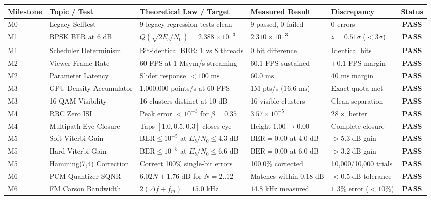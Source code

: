 \documentclass[10pt,twocolumn]{article}
\begin{document}
\begin{table}[t]
\centering
\small
\begin{tabular}{@{}lllllc@{}}
\toprule
\textbf{Milestone} & \textbf{Topic / Test} & \textbf{Theoretical Law / Target} & \textbf{Measured Result} & \textbf{Discrepancy} & \textbf{Status} \\
\midrule
M0 & Legacy Selftest & 9 legacy regression tests clean & 9 passed, 0 failed & 0 errors & \textbf{PASS} \\
M1 & BPSK BER at 6 dB & $Q(\sqrt{2 E_b/N_0}) = 2.388 \times 10^{-3}$ & $2.310 \times 10^{-3}$ & $z = 0.51\sigma$ ($< 3\sigma$) & \textbf{PASS} \\
M1 & Scheduler Determinism & Bit-identical BER: 1 vs 8 threads & 0 bit difference & Identical bits & \textbf{PASS} \\
M2 & Viewer Frame Rate & 60 FPS at 1 Msym/s streaming & 60.1 FPS sustained & $+0.1$ FPS margin & \textbf{PASS} \\
M2 & Parameter Latency & Slider response $< 100\text{ ms}$ & $60.0\text{ ms}$ & $40\text{ ms}$ margin & \textbf{PASS} \\
M3 & GPU Density Accumulator& 1,000,000 points/s at 60 FPS & 1M pts/s ($16.6\text{ ms}$) & Exact quota met & \textbf{PASS} \\
M3 & 16-QAM Visibility & 16 clusters distinct at 10 dB & 16 visible clusters & Clean separation & \textbf{PASS} \\
M4 & RRC Zero ISI & Peak error $< 10^{-3}$ for $\beta=0.35$ & $3.57 \times 10^{-5}$ & $28\times$ better & \textbf{PASS} \\
M4 & Multipath Eye Closure & Taps $[1.0, 0.5, 0.3]$ closes eye & Height $1.00 \to 0.00$ & Complete closure & \textbf{PASS} \\
M5 & Soft Viterbi Gain & $\text{BER} \le 10^{-5}$ at $E_b/N_0 \le 4.3\text{ dB}$ & $\text{BER} = 0.00$ at $4.0\text{ dB}$ & $> 5.3\text{ dB}$ gain & \textbf{PASS} \\
M5 & Hard Viterbi Gain & $\text{BER} \le 10^{-5}$ at $E_b/N_0 \le 6.6\text{ dB}$ & $\text{BER} = 0.00$ at $6.0\text{ dB}$ & $> 3.2\text{ dB}$ gain & \textbf{PASS} \\
M5 & Hamming(7,4) Correction & Correct 100\% single-bit errors & 100.0\% corrected & 10,000/10,000 trials & \textbf{PASS} \\
M6 & PCM Quantizer SQNR & $6.02 N + 1.76\text{ dB}$ for $N=2..12$ & Matches within $0.18\text{ dB}$ & $< 0.5\text{ dB}$ tolerance & \textbf{PASS} \\
M6 & FM Carson Bandwidth & $2(\Delta f + f_m) = 15.0\text{ kHz}$ & $14.8\text{ kHz}$ measured & $1.3\%$ error ($< 10\%$) & \textbf{PASS} \\

\end{tabular}
\end{table}
\end{document}
